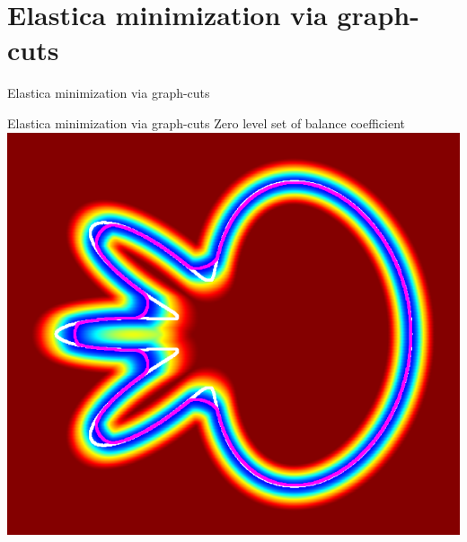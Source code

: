\section{Elastica minimization via graph-cuts}

\begin{frame}
\huge
Elastica minimization via graph-cuts
\end{frame}

\begin{frame}
{Elastica minimization via graph-cuts}
{Zero level set of balance coefficient}
\center
\includegraphics[scale=0.25]{figures/non-submodular-elastica/balance-coefficient-zero-level-set.png}
\end{frame}

